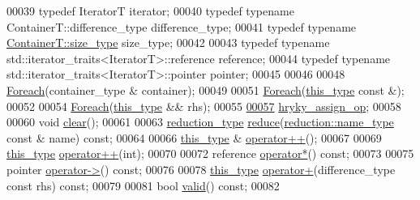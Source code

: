 \begin{DoxyCode}
00039     \textcolor{keyword}{typedef} IteratorT                               iterator;
00040     \textcolor{keyword}{typedef} \textcolor{keyword}{typename} ContainerT::difference\_type    difference\_type;
00041     \textcolor{keyword}{typedef} \textcolor{keyword}{typename} \hyperlink{namespacehryky_1_1display_a88ee3bfa154cce4c6715af0c3f53d062}{ContainerT::size_type}          size\_type;
00042 
00043     \textcolor{keyword}{typedef} \textcolor{keyword}{typename} std::iterator\_traits<IteratorT>::reference reference;
00044     \textcolor{keyword}{typedef} \textcolor{keyword}{typename} std::iterator\_traits<IteratorT>::pointer   pointer;
00045     
00046 
00048     \hyperlink{classhryky_1_1_foreach}{Foreach}(container\_type & container);
00049 
00051     \hyperlink{classhryky_1_1_foreach}{Foreach}(\hyperlink{classhryky_1_1_foreach}{this_type} \textcolor{keyword}{const} &);
00052 
00054     \hyperlink{classhryky_1_1_foreach}{Foreach}(\hyperlink{classhryky_1_1_foreach}{this_type} && rhs);
00055 
\hypertarget{foreach_8h_source_l00057}{}\hyperlink{classhryky_1_1_foreach_adb929133383d80020ed63d371efa71a8}{00057}     \hyperlink{classhryky_1_1_foreach_adb929133383d80020ed63d371efa71a8}{hryky_assign_op};
00058 
00060     \textcolor{keywordtype}{void} \hyperlink{classhryky_1_1_foreach_a2b0583cb5e910f561c8bc2e2c87cc37e}{clear}();
00061 
00063     \hyperlink{classhryky_1_1_intrusive_ptr}{reduction_type} \hyperlink{classhryky_1_1_foreach_a13a52462dd8b0dddf02ea2784517bf7a}{reduce}(\hyperlink{classhryky_1_1reduction_1_1_string}{reduction::name_type} \textcolor{keyword}{const} & name) \textcolor{keyword}{const};
00064 
00066     \hyperlink{classhryky_1_1_foreach}{this_type} & \hyperlink{classhryky_1_1_foreach_a630beb6360fa3cabbb602d80cd5f5b44}{operator++}();
00067 
00069     \hyperlink{classhryky_1_1_foreach}{this_type} \hyperlink{classhryky_1_1_foreach_a630beb6360fa3cabbb602d80cd5f5b44}{operator++}(\textcolor{keywordtype}{int});
00070 
00072     reference \hyperlink{classhryky_1_1_foreach_a20deebc90d417dacd6052ffab3bf03e2}{operator*}() \textcolor{keyword}{const};
00073 
00075     pointer \hyperlink{classhryky_1_1_foreach_a14234edb35e385a4d5ced44f41571bf8}{operator->}() \textcolor{keyword}{const};
00076 
00078     \hyperlink{classhryky_1_1_foreach}{this_type} \hyperlink{classhryky_1_1_foreach_a7e92bdcb9a54fe6a1713e6e23fb3fa56}{operator+}(difference\_type \textcolor{keyword}{const} rhs) \textcolor{keyword}{const};
00079 
00081     \textcolor{keywordtype}{bool} \hyperlink{classhryky_1_1_foreach_a45a07a1b312298448623a13c0e626d3a}{valid}() \textcolor{keyword}{const};
00082 

\end{DoxyCode}
